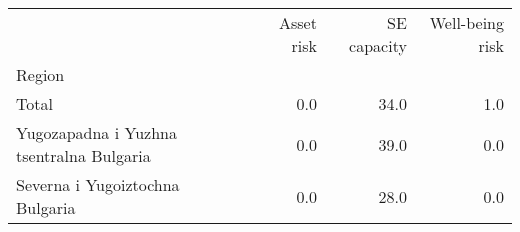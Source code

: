 \begin{tabular}{lrrr}
\toprule
{} &  Asset risk &  SE capacity &  Well-being risk \\
Region                                   &             &              &                  \\
\midrule
Total                                    &         0.0 &         34.0 &              1.0 \\
Yugozapadna i Yuzhna tsentralna Bulgaria &         0.0 &         39.0 &              0.0 \\
Severna i Yugoiztochna Bulgaria          &         0.0 &         28.0 &              0.0 \\
\bottomrule
\end{tabular}
